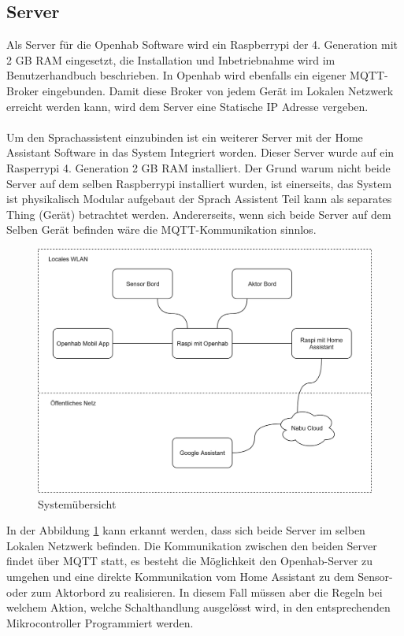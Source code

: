 \subsection{Server}\label{subsec: Server}
Als Server für die Openhab Software wird ein Raspberrypi der 4. Generation mit 2 GB RAM eingesetzt, die Installation und Inbetriebnahme wird im Benutzerhandbuch beschrieben. In Openhab wird ebenfalls ein eigener MQTT-Broker eingebunden. Damit diese Broker von jedem Gerät im Lokalen Netzwerk erreicht werden kann, wird dem Server eine Statische IP Adresse vergeben.\\
\\
Um den Sprachassistent einzubinden ist ein weiterer Server mit der Home Assistant Software in das System Integriert worden. Dieser Server wurde auf ein Rasperrypi 4. Generation 2 GB RAM installiert. Der Grund warum nicht beide Server auf dem selben Raspberrypi installiert wurden, ist einerseits, das System ist physikalisch Modular aufgebaut der Sprach Assistent Teil kann als separates Thing (Gerät) betrachtet werden. Andererseits, wenn sich beide Server auf dem Selben Gerät befinden wäre die MQTT-Kommunikation sinnlos.  



\begin{figure}[H]
	\centering
	\includegraphics[width=\textwidth]{graphics/Systemubersicht.png}
	\caption{Systemübersicht}
	\label{pic: Systemübersicht}
\end{figure}   

In der Abbildung \ref{pic: Systemübersicht} kann erkannt werden, dass sich beide Server im selben Lokalen Netzwerk befinden. Die Kommunikation zwischen den beiden Server findet über MQTT statt, es besteht die Möglichkeit den Openhab-Server zu umgehen und eine direkte Kommunikation vom Home Assistant zu dem Sensor- oder zum Aktorbord zu realisieren. In diesem Fall müssen aber die Regeln bei welchem Aktion, welche Schalthandlung ausgelösst wird, in den entsprechenden Mikrocontroller Programmiert werden.

